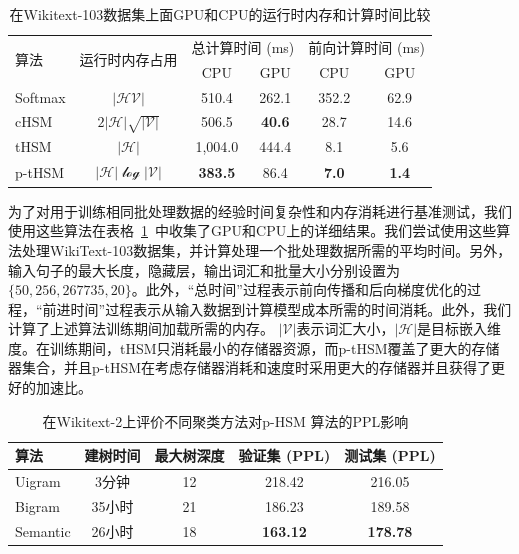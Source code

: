 \begin{table}[!ht]
  \centering
  \caption{在Wikitext-103数据集上面GPU和CPU的运行时内存和计算时间比较\label{tab:time}}
\begin{tabular}{lccccc}
  \toprule
 \multirow{2}{*}{算法}  &\multirow{2}{*}{运行时内存占用} &\multicolumn{2}{c}{总计算时间 (ms)} & \multicolumn{2}{c}{前向计算时间 (ms)}   \\
   \cmidrule(lr){3-4}  \cmidrule(lr){5-6}
	& & CPU&GPU & CPU& GPU \\ \midrule
Softmax & $\mathcal{|HV|}$ &510.4  &262.1&352.2& 62.9 \\
cHSM    & $2\mathcal{|H|\sqrt{|V|}}$&506.5  &\textbf{40.6}&28.7&14.6 \\
tHSM    &$\mathcal{|H|}$&1,004.0 &444.4 & 8.1&  5.6   \\
p-tHSM  &$\mathcal{|H|\log{|V|}}$ &\textbf{383.5}&	86.4 &\textbf{7.0}&	\textbf{1.4} \\
  \bottomrule
\end{tabular}
\end{table}


为了对用于训练相同批处理数据的经验时间复杂性和内存消耗进行基准测试，我们使用这些算法在表格~\ref{tab:time}~中收集了GPU和CPU上的详细结果。我们尝试使用这些算法处理WikiText-103数据集，并计算处理一个批处理数据所需的平均时间。另外，输入句子的最大长度，隐藏层，输出词汇和批量大小分别设置为$\{50, 256, 267735, 20\}$。此外，“总时间”过程表示前向传播和后向梯度优化的过程，“前进时间”过程表示从输入数据到计算模型成本所需的时间消耗。此外，我们计算了上述算法训练期间加载所需的内存。 $ \mathcal{| V |} $表示词汇大小，$ \mathcal{| H |} $是目标嵌入维度。在训练期间，tHSM只消耗最小的存储器资源，而p-tHSM覆盖了更大的存储器集合，并且p-tHSM在考虑存储器消耗和速度时采用更大的存储器并且获得了更好的加速比。

\begin{table}[!ht]
  \centering
   \caption{在Wikitext-2上评价不同聚类方法对p-HSM 算法的PPL影响\label{table:p-thsm}}
  \begin{tabular}{lcccc} \toprule
  算法  &建树时间&最大树深度 &验证集 (PPL) & 测试集 (PPL)  \\ \midrule
  Uigram  &3分钟&12 &218.42& 216.05     \\
  Bigram  &35小时&21& 186.23& 189.58\\
  Semantic &26小时 &18& \textbf{163.12} & \textbf{178.78}\\
\bottomrule
  \end{tabular}
\end{table}

